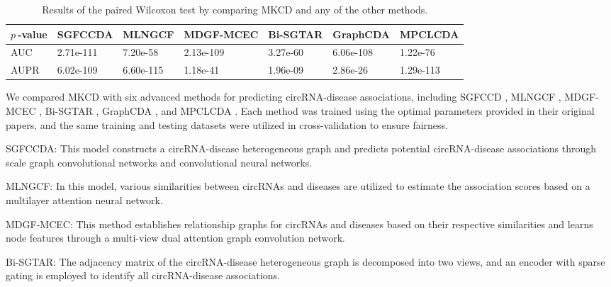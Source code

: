 \documentclass{bioinfo}
\begin{document}
\begin{methods}
\begin{table}[!t]
	\label{tab:02}
	\centering
	\begin{threeparttable}[b]
		\vspace{0.4cm}
		\renewcommand{\arraystretch}{1.3}  %
		\caption{Results of the paired Wilcoxon test by comparing MKCD and any of the other methods.  }\label{tab:tab2}
        \setlength{\tabcolsep}{0pt}  %
		\begin{tabular}{p{3.0cm}<{\centering}  p{2.9cm}<{\centering} p{2.9cm}<{\centering} p{2.9cm}<{\centering} p{2.9cm}<{\centering} p{2.9cm}<{\centering} p{2.9cm}<{\centering}}
			\hline
            \textbf{$p\ $-value} & \textbf{SGFCCDA} & \textbf{MLNGCF} & \textbf{MDGF-MCEC} &  \textbf{Bi-SGTAR} & \textbf{GraphCDA} & \textbf{MPCLCDA}\\
			\hline
		    AUC & 2.71e-111 & 7.20e-58 & 2.13e-109 &  3.27e-60 & 6.06e-108 & 1.22e-76 \\
		    AUPR & 6.02e-109 & 6.60e-115 & 1.18e-41 &  1.96e-09 & 2.86e-26 & 1.29e-113 \\
			\hline
		\end{tabular}
	\end{threeparttable}
	\vspace{-0.1cm}
\end{table}

We compared MKCD with six advanced methods for predicting circRNA-disease associations, including SGFCCD \cite{shang2024sgfccda}, MLNGCF \cite{wu2023mlngcf}, MDGF-MCEC \cite{wu2022mdgf}, Bi-SGTAR \cite{li2024bi}, GraphCDA \cite{dai2022graphcda}, and MPCLCDA \cite{liu2023mpclcda}. Each method was trained using the optimal parameters provided in their original papers, and the same training and testing datasets were utilized in cross-validation to ensure fairness.

SGFCCDA: This model constructs a circRNA-disease heterogeneous graph and predicts potential circRNA-disease associations through scale graph convolutional networks and convolutional neural networks.

MLNGCF: In this model, various similarities between circRNAs and diseases are utilized to estimate the association scores based on a multilayer attention neural network.

MDGF-MCEC: This method establishes relationship graphs for circRNAs and diseases based on their respective similarities and learns node features through a multi-view dual attention graph convolution network.

Bi-SGTAR: The adjacency matrix of the circRNA-disease heterogeneous graph is decomposed into two views, and an encoder with sparse gating is employed to identify all circRNA-disease associations.


\end{methods}
\end{document}

